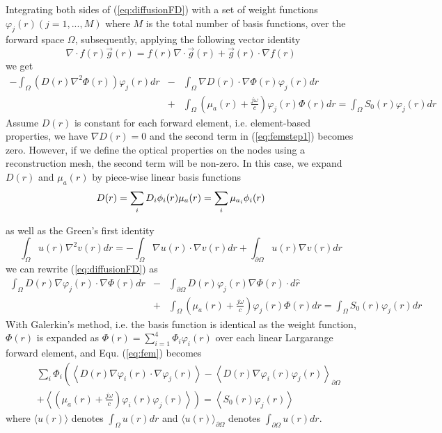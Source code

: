 \documentclass{article}
\begin{document}
Integrating both sides of (\ref{eq:diffusionFD}) with a set of weight functions $\varphi_j(r) (j=1,...,M)$
where $M$ is the total number of basis functions, over the forward space $\Omega$, subsequently, applying the following vector
identity
\begin{equation}
\label{eq:veciden}\nabla\cdot f(r)\vec{g}(r)=f(r)\nabla\cdot
\vec{g}(r)+\vec{g}(r)\cdot\nabla f(r)
\end{equation}
we get
\begin{eqnarray}
\label{eq:femstep1}
-\int_{\Omega}{(D(r)\nabla^2\Phi(r))\varphi_j(r)dr}&-&\int_{\Omega}{\nabla D(r)\cdot\nabla\Phi(r)
\varphi_j(r)dr}\\\nonumber &+&\int_{\Omega}
{\left(\mu_a(r)+\frac{j\omega}{c}\right)\varphi_j(r)\Phi(r)dr}=\int_{\Omega}
{S_0(r)\varphi_j(r)dr}
\end{eqnarray}
Assume $D(r)$ is constant for each forward element, i.e. element-based properties, 
we have $\nabla D(r)=0$ and the second term in (\ref{eq:femstep1}) becomes zero. 
However, if we define the optical properties on the nodes using a reconstruction mesh,
the second term will be non-zero. In this case, we expand $D(r)$ and $\mu_{a}(r)$ by
piece-wise linear basis functions
\begin{equation}
\label{eq:parammesh}D(r)=\sum_{i}D_i\phi_i(r) \\
\mu_{a}(r)=\sum_{i}\mu_{a_i}\phi_i(r)
\end{equation}

as well as the Green's first identity
\begin{equation}
\label{eq:Green1} \int_{\Omega}{u(r)\nabla^2
v(r)dr}=-\int_{\Omega}{\nabla u(r)\cdot\nabla
v(r)dr}+\int_{\partial\Omega} {u(r)\nabla v(r)dr}
\end{equation}
we can rewrite (\ref{eq:diffusionFD}) as
\begin{eqnarray}
\label{eq:fem}
\int_{\Omega}{D(r)\nabla\varphi_j(r)\cdot\nabla\Phi(r)dr}&-&\int_{\partial\Omega}{D(r)\varphi_j(r)\nabla\Phi(r)\cdot
d\hat{r}}\\\nonumber &+&\int_{\Omega}
{\left(\mu_a(r)+\frac{j\omega}{c}\right)\varphi_j(r)\Phi(r)dr}=\int_{\Omega}
{S_0(r)\varphi_j(r)dr}
\end{eqnarray}
With Galerkin's method, i.e. the basis function is identical as
the weight function, $\Phi(r)$ is expanded as
$\Phi(r)=\sum_{i=1}^{4}\Phi_i\varphi_i(r)$ over each linear
Largarange forward element, and Equ. (\ref{eq:fem}) becomes
\begin{eqnarray}
\label{eq:galerkin}\nonumber&&\sum_{i}\Phi_i\left(\left\langle
D(r)\nabla\varphi_i(r)\cdot\nabla\varphi_j(r)\right\rangle -
\left\langle
D(r)\nabla\varphi_i(r)\varphi_j(r)\right\rangle_{\partial\Omega}\right.
\\&&+ \left.\left\langle
\left(\mu_a(r)+
\frac{j\omega}{c}\right)\varphi_i(r)\varphi_j(r)\right\rangle\right)=\left\langle
S_0(r)\varphi_j(r)\right\rangle
\end{eqnarray}
where $\langle u(r)\rangle$ denotes $\int_{\Omega}u(r)dr$ and
$\langle u(r)\rangle_{\partial\Omega}$ denotes
$\int_{\partial\Omega}u(r) dr$.
\end{document}
